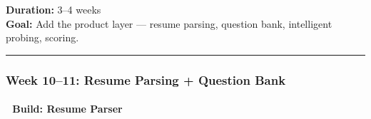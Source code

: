 \documentclass[
  11pt,
]{article}
\begin{document}
\textbf{Duration:} 3--4 weeks\\
\textbf{Goal:} Add the product layer --- resume parsing, question bank,
intelligent probing, scoring.

\begin{center}\rule{0.5\linewidth}{0.5pt}\end{center}

\hypertarget{week-1011-resume-parsing-question-bank}{%
\subsubsection{Week 10--11: Resume Parsing + Question
Bank}\label{week-1011-resume-parsing-question-bank}}

\hypertarget{build-resume-parser}{%
\paragraph{🔨 Build: Resume Parser}\label{build-resume-parser}}
\end{document}
